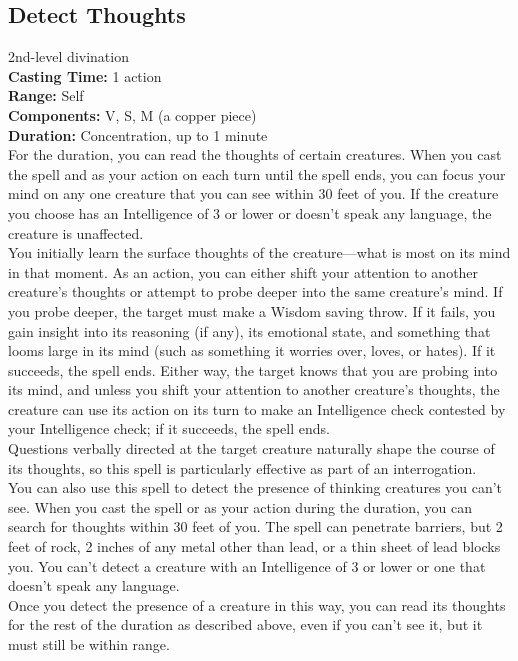 \documentclass[11pt, A4paper, english]{article}
\begin{document}
		\subsection{Detect Thoughts}
2nd-level divination \\
\textbf{Casting Time:} 1 action \\
\textbf{Range:} Self \\
\textbf{Components:} V, S, M (a copper piece) \\
\textbf{Duration:} Concentration, up to 1 minute \\
For the duration, you can read the thoughts of certain creatures. When you cast the spell and as your action on each turn until the spell ends, you can focus your mind on any one creature that you can see within 30 feet of you. If the creature you choose has an Intelligence of 3 or lower or doesn't speak any language, the creature is unaffected. \\
You initially learn the surface thoughts of the creature—what is most on its mind in that moment. As an action, you can either shift your attention to another creature’s thoughts or attempt to probe deeper into the same creature’s mind. If you probe deeper, the target must make a Wisdom saving throw. If it fails, you gain insight into its reasoning (if any), its emotional state, and something that looms large in its mind (such as something it worries over, loves, or hates). If it succeeds, the spell ends. Either way, the target knows that you are probing into its mind, and unless you shift your attention to another creature’s thoughts, the creature can use its action on its turn to make an Intelligence check contested by your Intelligence check; if it succeeds, the spell ends. \\
Questions verbally directed at the target creature naturally shape the course of its thoughts, so this spell is particularly effective as part of an interrogation. \\
You can also use this spell to detect the presence of thinking creatures you can’t see. When you cast the spell or as your action during the duration, you can search for thoughts within 30 feet of you. The spell can penetrate barriers, but 2 feet of rock, 2 inches of any metal other than lead, or a thin sheet of lead blocks you. You can’t detect a creature with an Intelligence of 3 or lower or one that doesn't speak any language. \\
Once you detect the presence of a creature in this way, you can read its thoughts for the rest of the duration as described above, even if you can’t see it, but it must still be within range.
\end{document}
